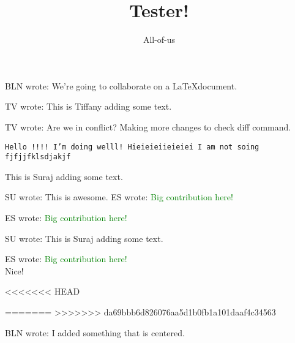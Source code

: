 \documentclass[12pt]{article}
\title{Tester!}
\author{All-of-us}
\newcommand{\bln}[1]{BLN wrote: \textcolor{red!70!blue!70}{#1}}
\newcommand{\tv}[1]{TV wrote: \textcolor{blue!70}{#1}}
\newcommand{\su}[1]{SU wrote: \textcolor{green!70}{#1}}
\newcommand{\es}[1]{ES wrote: \textcolor{green}{#1}}
\begin{document}
\maketitle

\bln{We're going to collaborate on a \LaTeX document.}

\tv{This is Tiffany adding some text.}

\tv{Are we in conflict? Making more changes to check diff command.}

\tt Hello !!!! I'm doing welll!
Hieieieiieieiei
I am not soing fjfjjfklsdjakjf


{This is Suraj adding some text.}

\su{This is awesome.}
\es{Big contribution here!}




\es{Big contribution here!}


\su{This is Suraj adding some text.}

\es{Big contribution here!}\\
{Nice!}



<<<<<<< HEAD

=======
>>>>>>> da69bbb6d826076aa5d1b0fb1a101daaf4c34563
\begin{center}
  \bln{I added something that is centered.}
\end{center}
\end{document}
